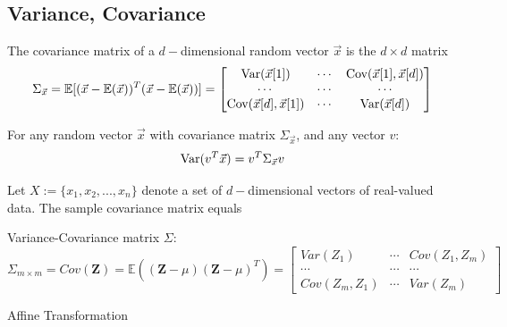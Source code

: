 \documentclass[11pt]{elegantbook}
\begin{document}
\subsection{Variance, Covariance}
\begin{definition}
    The covariance matrix of a $d-$dimensional random vector $\vec{x}$ is the $d\times d$ matrix
    \begin{equation}
        \begin{aligned}
            \Sigma_{\vec{x}}=\mathbb{E}[(\vec{x}-\mathbb{E}(\vec{x}))^T(\vec{x}-\mathbb{E}(\vec{x}))]=\begin{bmatrix}
                \textnormal{Var}(\vec{x}[1])&\cdots	&\textnormal{Cov}(\vec{x}[1],\vec{x}[d])\\
                \cdots&\cdots	&\cdots\\
                \textnormal{Cov}(\vec{x}[d],\vec{x}[1])&\cdots &\textnormal{Var}(\vec{x}[d])
            \end{bmatrix}
        \end{aligned}
        \nonumber
    \end{equation}
\end{definition}
\begin{lemma}
    For any random vector $\vec{x}$ with covariance matrix $\Sigma_{\vec{x}}$, and any vector $v$:
    \begin{equation}
        \begin{aligned}
            \textnormal{Var}(v^T \vec{x})= v^T\Sigma_{\vec{x}}v
        \end{aligned}
        \nonumber
    \end{equation}
\end{lemma}

\begin{definition}
    Let $X := \{x_1, x_2, . . ., x_n\}$ denote a set of $d-$dimensional vectors of real-valued data. The sample covariance matrix equals
\end{definition}

Variance-Covariance matrix $\Sigma$:
$$\Sigma_{m\times m}=Cov(\mathbf{Z})=\mathbb{E}((\mathbf{Z}-\mu)(\mathbf{Z}-\mu)^T)=\begin{bmatrix}
    Var(Z_1)&\cdots	&Cov(Z_1,Z_m)\\
    \cdots&\cdots	&\cdots\\
    Cov(Z_m,Z_1)&\cdots &Var(Z_m)
\end{bmatrix}$$

Affine Transformation
\end{document}
